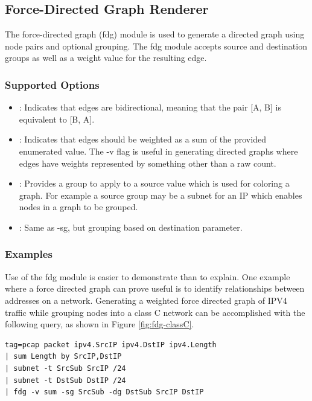 \clearpage

\subsection{Force-Directed Graph Renderer}
The force-directed graph (fdg) module is used to generate a directed
graph using node pairs and optional grouping. The fdg module accepts
source and destination groups as well as a weight value for the
resulting edge.

\subsubsection{Supported Options}

\begin{itemize}
\item
  : Indicates that edges are bidirectional, meaning that the pair
  [A, B] is equivalent to [B, A].
\item
  : Indicates that edges
  should be weighted as a sum of the provided enumerated value. The -v
  flag is useful in generating directed graphs where edges have weights
  represented by something other than a raw count.
\item
  : Provides a group to
  apply to a source value which is used for coloring a graph. For
  example a source group may be a subnet for an IP which enables nodes
  in a graph to be grouped.
\item
  : Same as -sg, but
  grouping based on destination parameter.
\end{itemize}

\subsubsection{Examples}

Use of the fdg module is easier to demonstrate than to explain. One
example where a force directed graph can prove useful is to identify
relationships between addresses on a network. Generating a weighted
force directed graph of IPV4 traffic while grouping nodes into a class C
network can be accomplished with the following query, as shown in Figure \ref{fig:fdg-classC}.

\begin{Verbatim}[breaklines=true]
tag=pcap packet ipv4.SrcIP ipv4.DstIP ipv4.Length 
| sum Length by SrcIP,DstIP 
| subnet -t SrcSub SrcIP /24 
| subnet -t DstSub DstIP /24 
| fdg -v sum -sg SrcSub -dg DstSub SrcIP DstIP
\end{Verbatim}

